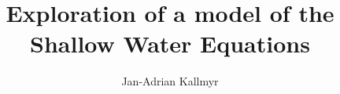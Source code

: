 \documentclass[a4paper, 11pt, twocolumn]{article}
\begin{document}
\title{Exploration of a model of the Shallow Water Equations}

\author{Jan-Adrian Kallmyr}

\twocolumn[
  \begin{@twocolumnfalse}
    \maketitle
%    
  \end{@twocolumnfalse}
]














%

%
\end{document}
